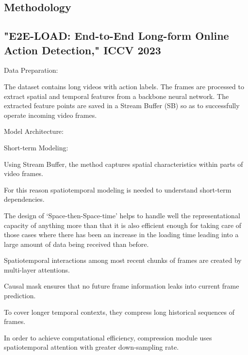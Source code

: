 
\subsection{Methodology}
{
\subsection{"E2E-LOAD: End-to-End Long-form Online Action Detection," ICCV 2023}

Data Preparation:

The dataset contains long videos with action labels. The frames are processed to extract spatial and temporal features from a backbone neural network. The extracted feature points are saved in a Stream Buffer (SB) so as to successfully operate incoming video frames.

Model Architecture:

Short-term Modeling:

Using Stream Buffer, the method captures spatial characteristics within parts of video frames.

For this reason spatiotemporal modeling is needed to understand short-term dependencies.

The design of ‘Space-then-Space-time’ helps to handle well the representational capacity of anything more than that it is also efficient enough for taking care of those cases where there has been an increase in the loading time leading into a large amount of data being received than before.

Spatiotemporal interactions among most recent chunks of frames are created by multi-layer attentions.

Causal mask ensures that no future frame information leaks into current frame prediction.



To cover longer temporal contexts, they compress long historical sequences of frames.

In order to achieve computational efficiency, compression module uses spatiotemporal attention with greater down-sampling rate.

}
